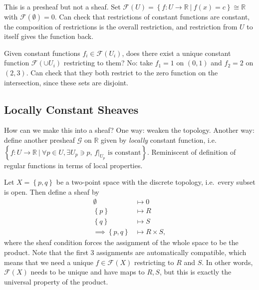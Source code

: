 \begin{answer}

This is a presheaf but not a sheaf. Set
\(\mathcal{F}(U) = \left\{{f: U\to {\mathbb{R}}{~\mathrel{\Big|}~}f(x) = c}\right\} \cong {\mathbb{R}}\)
with \(\mathcal{F}(\emptyset) = 0\). Can check that restrictions of
constant functions are constant, the composition of restrictions is the
overall restriction, and restriction from \(U\) to itself gives the
function back.

Given constant functions \(f_i \in \mathcal{F}(U_i)\), does there exist
a unique constant function \(\mathcal{F}(\cup U_i)\) restricting to
them? No: take \(f_1 = 1\) on \((0, 1)\) and \(f_2 = 2\) on \((2, 3)\).
Can check that they both restrict to the zero function on the
intersection, since these sets are disjoint.

\end{answer}

\hypertarget{locally-constant-sheaves}{%
\subsection{Locally Constant Sheaves}\label{locally-constant-sheaves}}

How can we make this into a sheaf? One way: weaken the topology. Another
way: define another presheaf \(\mathcal{G}\) on \({\mathbb{R}}\) given
by \emph{locally} constant function,
i.e.~\(\left\{{f: U\to {\mathbb{R}}{~\mathrel{\Big|}~}\forall p\in U, \exists U_p\ni p,\, { \left.{{f}} \right|_{{U_p}} } \text{ is constant}}\right\}\).
Reminiscent of definition of regular functions in terms of local
properties.

\begin{example}

Let \(X = \left\{{p, q}\right\}\) be a two-point space with the discrete
topology, i.e.~every subset is open. Then define a sheaf by
\begin{align*}  
\emptyset &\mapsto 0 \\
\left\{{p}\right\} &\mapsto R \\
\left\{{q}\right\} &\mapsto S \\
\implies \left\{{p, q}\right\} &\mapsto R\times S
,\end{align*}
where the sheaf condition forces the assignment of the whole space to be
the product. Note that the first 3 assignments are automatically
compatible, which means that we need a unique \(f\in \mathcal{F}(X)\)
restricting to \(R\) and \(S\). In other words, \(\mathcal{F}(X)\) needs
to be unique and have maps to \(R, S\), but this is exactly the
universal property of the product.

\end{example}

